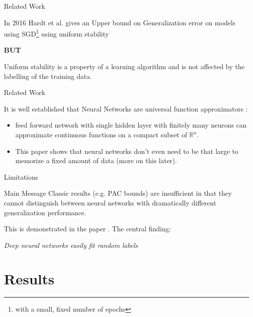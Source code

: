 \documentclass[10pt]{beamer}
\begin{document}
\begin{frame}{Related Work}

In 2016 Hardt et al. gives an Upper bound on Generalization error on models using SGD\footnote{with a small, fixed number of epochs} using uniform stability \cite{DBLP:journals/corr/HardtRS15}

\textbf{BUT}

Uniform stability is a property of a learning algorithm and is not affected by the labelling of the training data.

\end{frame}

\begin{frame}{Related Work}
	
	It is well established that Neural Networks are universal function approximators \cite{2017arXiv170605394A}:
	\begin{itemize}
		\item feed forward network with single hidden layer with finitely many neurons can approximate continuous functions on a compact subset of $\mathbb{R}^n$.
		\item This paper shows that neural networks don't even need to be that large to memorize a fixed amount of data (more on this later).
	\end{itemize}
	
\end{frame}

\begin{frame}{Limitations}
\begin{alertblock}{Main Message}
	Classic results (e.g. PAC bounds) are insufficient in that they cannot distinguish between neural networks with dramatically different generalization performance.
\end{alertblock}

This is demonstrated in the paper \cite{DBLP:journals/corr/ZhangBHRV16}. The central finding:

\begin{center}
	\emph{Deep neural networks easily fit random labels}
\end{center}

\end{frame}	

\section{Results}
\end{document}

